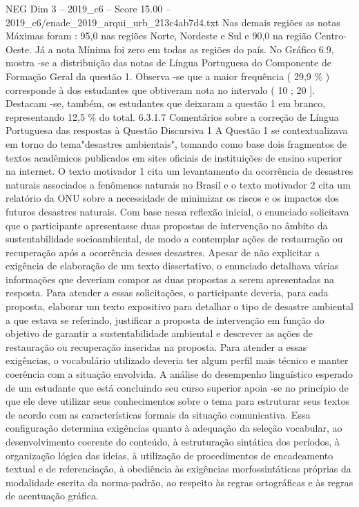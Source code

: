 \begin{textsample}{NEG Dim 3 – 2019\_c6 – Score 15.00 – 2019\_c6/enade\_2019\_arqui\_urb\_213c4ab7d4.txt}
Nas demais regiões as notas Máximas foram : 95,0 nas regiões Norte, Nordeste e Sul e 90,0 na região Centro-Oeste.
Já a nota Mínima foi zero em todas as regiões do país.
No Gráfico 6.9, mostra -se a distribuição das notas de Língua Portuguesa do Componente de Formação Geral da questão 1.
Observa -se que a maior frequência ( 29,9 \% ) corresponde à dos estudantes que obtiveram nota no intervalo ( 10 ; 20 ].
Destacam -se, também, os estudantes que deixaram a questão 1 em branco, representando 12,5 \% do total. 6.3.1.7 Comentários sobre a correção de Língua Portuguesa das respostas à Questão Discursiva 1 A Questão 1 se contextualizava em torno do tema"desastres ambientais", tomando como base dois fragmentos de textos acadêmicos publicados em sites oficiais de instituições de ensino superior na internet.
O texto motivador 1 cita um levantamento da ocorrência de desastres naturais associados a fenômenos naturais no Brasil e o texto motivador 2 cita um relatório da ONU sobre a necessidade de minimizar os riscos e os impactos dos futuros desastres naturais.
Com base nessa reflexão inicial, o enunciado solicitava que o participante apresentasse duas propostas de intervenção no âmbito da sustentabilidade socioambiental, de modo a contemplar ações de restauração ou recuperação após a ocorrência desses desastres.
Apesar de não explicitar a exigência de elaboração de um texto dissertativo, o enunciado detalhava várias informações que deveriam compor as duas propostas a serem apresentadas na resposta.
Para atender a essas solicitações, o participante deveria, para cada proposta, elaborar um texto expositivo para detalhar o tipo de desastre ambiental a que estava se referindo, justificar a proposta de intervenção em função do objetivo de garantir a sustentabilidade ambiental e descrever as ações de restauração ou recuperação inseridas na proposta.
Para atender a essas exigências, o vocabulário utilizado deveria ter algum perfil mais técnico e manter coerência com a situação envolvida.
A análise do desempenho linguístico esperado de um estudante que está concluindo seu curso superior apoia -se no princípio de que ele deve utilizar seus conhecimentos sobre o tema para estruturar seus textos de acordo com as características formais da situação comunicativa.
Essa configuração determina exigências quanto à adequação da seleção vocabular, ao desenvolvimento coerente do conteúdo, à estruturação sintática dos períodos, à organização lógica das ideias, à utilização de procedimentos de encadeamento textual e de referenciação, à obediência às exigências morfossintáticas próprias da modalidade escrita da norma-padrão, ao respeito às regras ortográficas e às regras de acentuação gráfica.

\end{textsample}
